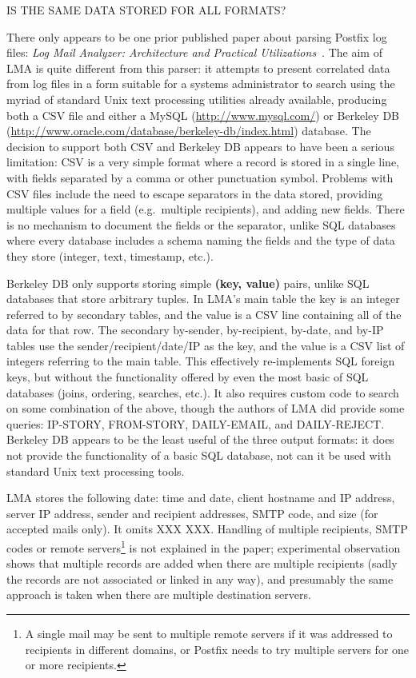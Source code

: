 IS THE SAME DATA STORED FOR ALL FORMATS\@?

\label{prior art}

There only appears to be one prior published paper about parsing Postfix
log files: \textit{Log Mail Analyzer: Architecture and Practical
Utilizations\/}~\cite{log-mail-analyser}.  The aim of \gls{LMA} is quite
different from this parser: it attempts to present correlated data from log
files in a form suitable for a systems administrator to search using the
myriad of standard Unix text processing utilities already available,
producing both a \gls{CSV} file and either a MySQL
(\url{http://www.mysql.com/}) or Berkeley DB
(\url{http://www.oracle.com/database/berkeley-db/index.html}) database.
The decision to support both \gls{CSV} and Berkeley DB appears to have been
a serious limitation: \gls{CSV} is a very simple format where a record is
stored in a single line, with fields separated by a comma or other
punctuation symbol.  Problems with \gls{CSV} files include the need to
escape separators in the data stored, providing multiple values for a field
(e.g.\ multiple recipients), and adding new fields.  There is no mechanism
to document the fields or the separator, unlike \gls{SQL} databases where
every database includes a schema naming the fields and the type of data
they store (integer, text, timestamp, etc.).

Berkeley DB only supports storing simple \textbf{(key, value)} pairs,
unlike \gls{SQL} databases that store arbitrary tuples.  In \gls{LMA}'s
main table the key is an integer referred to by secondary tables, and the
value is a \gls{CSV} line containing all of the data for that row.  The
secondary by-sender, by-recipient, by-date, and by-\gls{IP} tables use the
sender/recipient/date/\gls{IP} as the key, and the value is a \gls{CSV}
list of integers referring to the main table.  This effectively
re-implements \gls{SQL} foreign keys, but without the functionality offered
by even the most basic of \gls{SQL} databases (joins, ordering, searches,
etc.).  It also requires custom code to search on some combination of the
above, though the authors of \gls{LMA} did provide some queries: IP-STORY,
FROM-STORY, DAILY-EMAIL, and DAILY-REJECT\@.  Berkeley DB appears to be the
least useful of the three output formats: it does not provide the
functionality of a basic \gls{SQL} database, not can it be used with
standard Unix text processing tools.

\gls{LMA} stores the following date: time and date, client hostname and
\gls{IP} address, server \gls{IP} address, sender and recipient addresses,
\gls{SMTP} code, and size (for accepted mails only).  It omits XXX XXX\@.
Handling of multiple recipients, \gls{SMTP} codes or remote
servers\footnote{A single mail may be sent to multiple remote servers if it
was addressed to recipients in different domains, or Postfix needs to try
multiple servers for one or more recipients.} is not explained in the
paper; experimental observation shows that multiple records are added when
there are multiple recipients (sadly the records are not associated or
linked in any way), and presumably the same approach is taken when there
are multiple destination servers.

